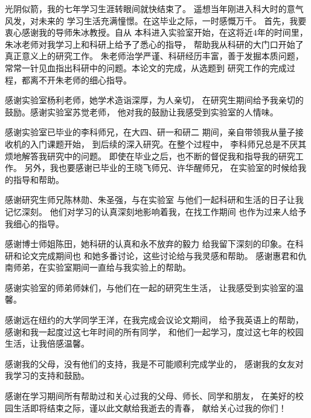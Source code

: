 \begin{acknowledgements}
光阴似箭，我的七年学习生涯转眼间就快结束了。
遥想当年刚进入科大时的意气风发，对未来的
学习生活充满憧憬。在这毕业之际，一时感慨万千。
首先，我要衷心感谢我的导师朱冰教授。自从
本科进入实验室开始，在这将近4年的时间里，
朱冰老师对我学习上和科研上给予了悉心的指导，
帮助我从科研的大门口开始了真正意义上的研究工作。
朱老师治学严谨、科研经历丰富，善于发掘本质问题，
常常一针见血指出科研中的问题。本论文的完成，从选题到
研究工作的完成过程，都离不开朱老师的细心指导。

感谢实验室杨利老师，她学术造诣深厚，为人亲切，
在研究生期间给予我亲切的鼓励。感谢实验室苏觉老师，
他对我的鼓励让我感受到实验室的人情味。

感谢实验室已毕业的李科师兄，在大四、研一和研二
期间，亲自带领我从量子接收机的入门课题开始，
到后续的深入研究。在整个过程中，
李科师兄总是不厌其烦地解答我研究中的问题。
即使在毕业之后，也不断的督促我和指导我的研究工作。
另外，我也要感谢已毕业的王晓飞师兄、许华醒师兄，
在实验室的时候给我的指导和帮助。

感谢研究生师兄陈林勋、朱圣强，与在实验室
与他们一起科研和生活的日子让我记忆深刻。
他们对学习的认真深刻地影响着我，在找工作期间
也作为过来人给予我细心的指导。

感谢博士师姐陈田，她科研的认真和永不放弃的毅力
给我留下深刻的印象。在科研和论文完成期间也
和她多番讨论，这些讨论给与我灵感和帮助。
感谢惠君和仇南师弟，在实验室期间一直给与我实验上的帮助。

感谢实验室的师弟师妹们，与他们在一起的研究生生活，
让我感受到实验室的温馨。

感谢远在纽约的大学同学王洋，在我完成会议论文期间，
给予我英语上的帮助，感谢和我一起度过这七年时间的所有同学，
和他们一起学习，度过这七年的校园生活，让我倍感温馨。

感谢我的父母，没有他们的支持，我是不可能顺利完成学业的，
感谢我的女友对我学习的支持和鼓励。

感谢在学习期间所有帮助过和关心过我的父母、师长、同学和朋友，
在美好的校园生活即将结束之际，谨以此文献给我逝去的青春，
献给关心过我的你们！

\end{acknowledgements}
